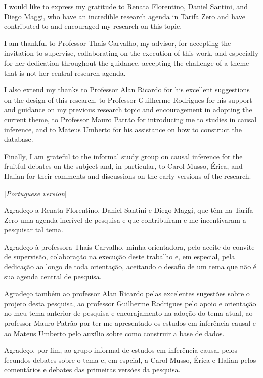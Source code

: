 \documentclass[12pt, a4paper, twoside]{article}
\numberwithin{equation}{subsection} %
\begin{document}
I would like to express my gratitude to Renata Florentino, Daniel Santini, and Diego Maggi, who have an incredible research agenda in Tarifa Zero and have contributed to and encouraged my research on this topic.

I am thankful to Professor Thaís Carvalho, my advisor, for accepting the invitation to supervise, collaborating on the execution of this work, and especially for her dedication throughout the guidance, accepting the challenge of a theme that is not her central research agenda.

I also extend my thanks to Professor Alan Ricardo for his excellent suggestions on the design of this research, to Professor Guilherme Rodrigues for his support and guidance on my previous research topic and encouragement in adopting the current theme, to Professor Mauro Patrão for introducing me to studies in causal inference, and to Mateus Umberto for his assistance on how to construct the database.

Finally, I am grateful to the informal study group on causal inference for the fruitful debates on the subject and, in particular, to Carol Musso, Érica, and Halian for their comments and discussions on the early versions of the research.


[\textit{Portuguese version}]

Agradeço a Renata Florentino, Daniel Santini e Diego Maggi, que têm na Tarifa Zero uma agenda incrível de pesquisa e que contribuíram e me incentivaram a pesquisar tal tema.

Agradeço à professora Thaís Carvalho, minha orientadora, pelo aceite do convite de supervisão, colaboração na execução deste trabalho e, em especial, pela dedicação ao longo de toda orientação, aceitando o desafio de um tema que não é sua agenda central de pesquisa.

Agradeço também ao professor Alan Ricardo pelas excelentes sugestões sobre o projeto desta pesquisa, ao professor Guilherme Rodrigues pelo apoio e orientação no meu tema anterior de pesquisa e encorajamento na adoção do tema atual, ao professor Mauro Patrão por ter me apresentado os estudos em inferência causal e ao Mateus Umberto pelo auxílio sobre como construir a base de dados.

Agradeço, por fim, ao grupo informal de estudos em inferência causal pelos fecundos debates sobre o tema e, em espcial, a Carol Musso, Érica e Halian pelos comentários e debates das primeiras versões da pesquisa.


\newpage
\end{document}

